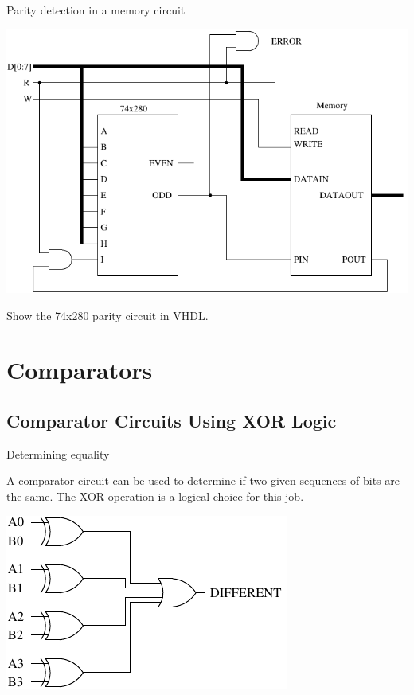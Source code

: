\begin{frame}{Parity detection in a memory circuit}
  \begin{center}
    \includegraphics[scale=0.7]{MemoryCircuitParity}
  \end{center}
\end{frame}

Show the 74x280 parity circuit in VHDL.

\section{Comparators}
\subsection{Comparator Circuits Using XOR Logic}

\begin{frame}{Determining equality}
  \begin{definition}
    A \alert{comparator} circuit can be used to determine if two given sequences of bits are the same.  The XOR operation is a logical choice for this job.
  \end{definition}
  \begin{center}
    \includegraphics{ComparatorLogic}
  \end{center}
\end{frame}

